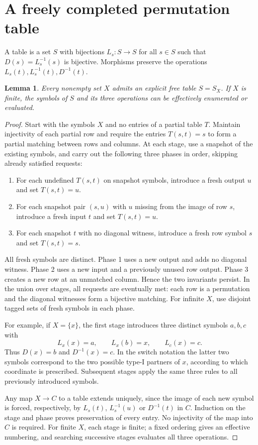\documentclass[11pt,a4paper]{article}
\newtheorem{lemma}[theorem]{Lemma}
\begin{document}
\section{A freely completed permutation table}
A table is a set $S$ with bijections $L_s:S\to S$ for all $s\in S$ such that $D(s)=L_s^{-1}(s)$ is bijective. Morphisms preserve the operations $L_s(t),L_s^{-1}(t),D^{-1}(t)$.
\begin{lemma}\label{table}
Every nonempty set $X$ admits an explicit free table $S=S_X$. If $X$ is finite, the symbols of $S$ and its three operations can be effectively enumerated or evaluated.
\end{lemma}
\begin{proof}
Start with the symbols $X$ and no entries of a partial table $T$. Maintain injectivity of each partial row and require the entries $T(s,t)=s$ to form a partial matching between rows and columns. At each stage, use a snapshot of the existing symbols, and carry out the following three phases in order, skipping already satisfied requests:
\begin{enumerate}
\item For each undefined $T(s,t)$ on snapshot symbols, introduce a fresh output $u$ and set $T(s,t)=u$.
\item For each snapshot pair $(s,u)$ with $u$ missing from the image of row $s$, introduce a fresh input $t$ and set $T(s,t)=u$.
\item For each snapshot $t$ with no diagonal witness, introduce a fresh row symbol $s$ and set $T(s,t)=s$.
\end{enumerate}
All fresh symbols are distinct. Phase 1 uses a new output and adds no diagonal witness. Phase 2 uses a new input and a previously unused row output. Phase 3 creates a new row at an unmatched column. Hence the two invariants persist. In the union over stages, all requests are eventually met: each row is a permutation and the diagonal witnesses form a bijective matching. For infinite $X$, use disjoint tagged sets of fresh symbols in each phase.

For example, if $X=\{x\}$, the first stage introduces three distinct symbols $a,b,c$ with
\[
L_x(x)=a,\qquad L_x(b)=x,\qquad L_c(x)=c.
\]
Thus $D(x)=b$ and $D^{-1}(x)=c$. In the switch notation the latter two symbols correspond to the two possible type-I partners of $x$, according to which coordinate is prescribed. Subsequent stages apply the same three rules to all previously introduced symbols.

Any map $X\to C$ to a table extends uniquely, since the image of each new symbol is forced, respectively, by $L_s(t)$, $L_s^{-1}(u)$ or $D^{-1}(t)$ in $C$. Induction on the stage and phase proves preservation of every entry. No injectivity of the map into $C$ is required. For finite $X$, each stage is finite; a fixed ordering gives an effective numbering, and searching successive stages evaluates all three operations.
\end{proof}
\end{document}
